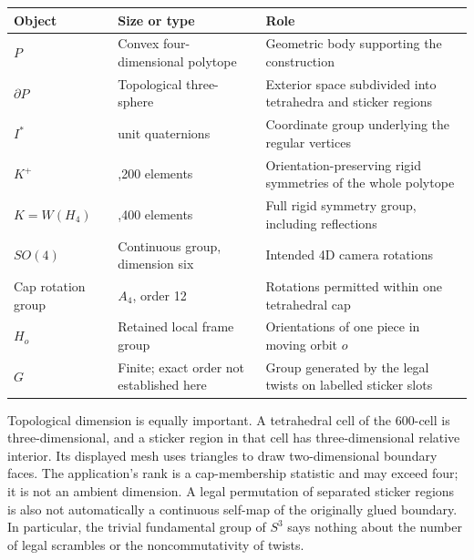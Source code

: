 \documentclass[
  10pt,
  a4paper,
]{article}
\newcounter{none} %
\begin{document}
{\def\LTcaptype{none} %
\begin{longtable}[]{@{}
  >{\raggedright\arraybackslash}p{}
  >{\raggedright\arraybackslash}p{}
  >{\raggedright\arraybackslash}p{}@{}}
\toprule\noalign{}
\begin{minipage}[b]{\linewidth}\raggedright
Object
\end{minipage} & \begin{minipage}[b]{\linewidth}\raggedright
Size or type
\end{minipage} & \begin{minipage}[b]{\linewidth}\raggedright
Role
\end{minipage} \\
\midrule\noalign{}
\endhead
\bottomrule\noalign{}
\endlastfoot
\(P\) & Convex four-dimensional polytope & Geometric body supporting the
construction \\
\(\partial P\) & Topological three-sphere & Exterior space subdivided
into tetrahedra and sticker regions \\
\(I^*\) & 120 unit quaternions & Coordinate group underlying the regular
vertices \\
\(K^+\) & 7,200 elements & Orientation-preserving rigid symmetries of
the whole polytope \\
\(K=W(H_4)\) & 14,400 elements & Full rigid symmetry group, including
reflections \\
\(SO(4)\) & Continuous group, dimension six & Intended 4D camera
rotations \\
Cap rotation group & \(A_4\), order 12 & Rotations permitted within one
tetrahedral cap \\
\(H_o\) & Retained local frame group & Orientations of one piece in
moving orbit \(o\) \\
\(G\) & Finite; exact order not established here & Group generated by
the legal twists on labelled sticker slots \\
\end{longtable}
}

Topological dimension is equally important. A tetrahedral cell of the
600-cell is three-dimensional, and a sticker region in that cell has
three-dimensional relative interior. Its displayed mesh uses triangles
to draw two-dimensional boundary faces. The application's rank is a
cap-membership statistic and may exceed four; it is not an ambient
dimension. A legal permutation of separated sticker regions is also not
automatically a continuous self-map of the originally glued boundary. In
particular, the trivial fundamental group of \(S^3\) says nothing about
the number of legal scrambles or the noncommutativity of twists.
\end{document}

